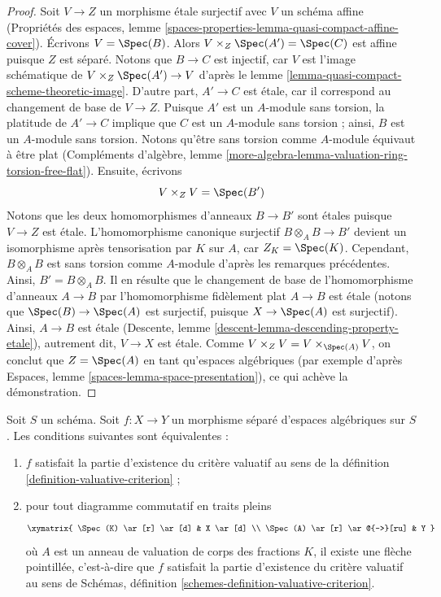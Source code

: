 \begin{proof}
\medskip\noindent
Soit $V \to Z$ un morphisme étale surjectif avec $V$ un
schéma affine (Propriétés des espaces, lemme
\ref{spaces-properties-lemma-quasi-compact-affine-cover}).
Écrivons $V = \Spec(B)$. Alors $V \times_Z \Spec(A') = \Spec(C)$
est affine puisque $Z$ est séparé. Notons que $B \to C$ est injectif,
car $V$ est l'image schématique de $V \times_Z \Spec(A') \to V$
d'après le lemme \ref{lemma-quasi-compact-scheme-theoretic-image}.
D'autre part, $A' \to C$ est étale, car il correspond
au changement de base de $V \to Z$.
Puisque $A'$ est un $A$-module sans torsion,
la platitude de $A' \to C$ implique que $C$ est un
$A$-module sans torsion ; ainsi, $B$ est un $A$-module sans torsion.
Notons qu'être sans torsion comme $A$-module équivaut
à être plat (Compléments d'algèbre, lemme
\ref{more-algebra-lemma-valuation-ring-torsion-free-flat}).
Ensuite, écrivons
$$
V \times_Z V = \Spec(B')
$$
Notons que les deux homomorphismes d'anneaux $B \to B'$ sont étales puisque $V \to Z$
est étale. L'homomorphisme canonique surjectif $B \otimes_A B \to B'$
devient un isomorphisme après tensorisation par $K$ sur $A$,
car $Z_K = \Spec(K)$. Cependant, $B \otimes_A B$ est sans torsion
comme $A$-module d'après les remarques précédentes. Ainsi, $B' = B \otimes_A B$.
Il en résulte que le changement de base de l'homomorphisme d'anneaux
$A \to B$ par l'homomorphisme fidèlement plat $A \to B$
est étale (notons que $\Spec(B) \to \Spec(A)$ est surjectif,
puisque $X \to \Spec(A)$ est surjectif). Ainsi, $A \to B$ est
étale (Descente, lemme \ref{descent-lemma-descending-property-etale}),
autrement dit, $V \to X$ est étale.
Comme $V \times_Z V = V \times_{\Spec(A)} V$,
on conclut que $Z = \Spec(A)$ en tant qu'espaces algébriques
(par exemple d'après Espaces, lemme \ref{spaces-lemma-space-presentation}),
ce qui achève la démonstration.
\end{proof}

\begin{lemma}
\label{lemma-usual-enough}
Soit $S$ un schéma. Soit $f : X \to Y$ un morphisme séparé d'espaces
algébriques sur $S$. Les conditions suivantes sont équivalentes :
\begin{enumerate}
\item $f$ satisfait la partie d'existence du critère valuatif
au sens de la définition \ref{definition-valuative-criterion} ;
\item pour tout diagramme commutatif en traits pleins
$$
\xymatrix{
\Spec(K) \ar[r] \ar[d] & X \ar[d] \\
\Spec(A) \ar[r] \ar@{-->}[ru] & Y
}
$$
où $A$ est un anneau de valuation de corps des fractions $K$, il existe
une flèche pointillée, c'est-à-dire que $f$ satisfait la partie d'existence du critère
valuatif au sens de
Schémas, définition \ref{schemes-definition-valuative-criterion}.
\end{enumerate}
\end{lemma}

